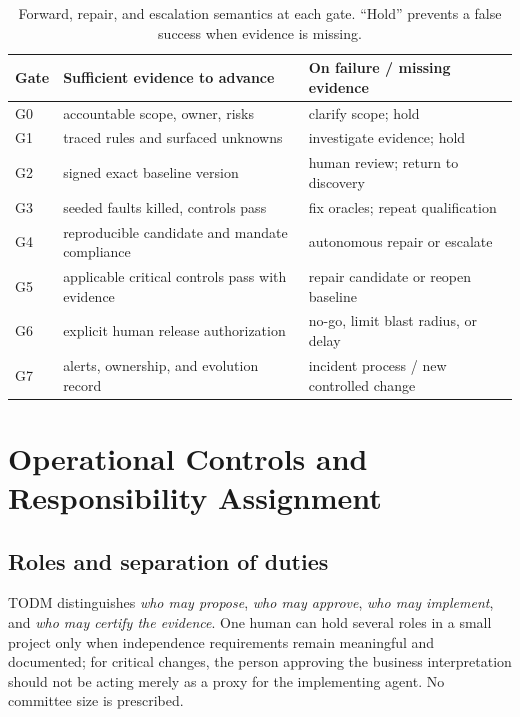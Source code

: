 \documentclass[11pt,a4paper]{article}
\begin{document}
\begin{table}[htbp]
\centering\small
\caption{Forward, repair, and escalation semantics at each gate. ``Hold'' prevents a false success when evidence is missing.}
\begin{tabularx}{\linewidth}{@{}lX X@{}}
\toprule
Gate & Sufficient evidence to advance & On failure / missing evidence \\
\midrule
G0 & accountable scope, owner, risks & clarify scope; hold \\
G1 & traced rules and surfaced unknowns & investigate evidence; hold \\
G2 & signed exact baseline version & human review; return to discovery \\
G3 & seeded faults killed, controls pass & fix oracles; repeat qualification \\
G4 & reproducible candidate and mandate compliance & autonomous repair or escalate \\
G5 & applicable critical controls pass with evidence & repair candidate or reopen baseline \\
G6 & explicit human release authorization & no-go, limit blast radius, or delay \\
G7 & alerts, ownership, and evolution record & incident process / new controlled change \\
\bottomrule
\end{tabularx}
\label{tab:gates}
\end{table}


\section{Operational Controls and Responsibility Assignment}
\subsection{Roles and separation of duties}
TODM distinguishes \emph{who may propose}, \emph{who may approve}, \emph{who may implement}, and \emph{who may certify the evidence}. One human can hold several roles in a small project only when independence requirements remain meaningful and documented; for critical changes, the person approving the business interpretation should not be acting merely as a proxy for the implementing agent. No committee size is prescribed.
\end{document}
